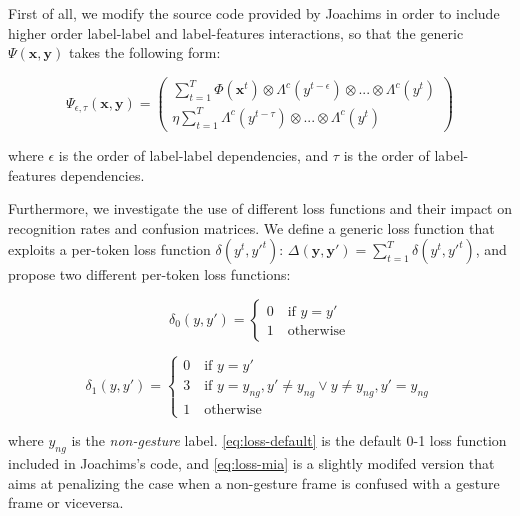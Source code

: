  First of all, we modify the source code provided by Joachims \cite{joachims} in order to include higher order label-label and label-features interactions, so that the generic 
$\Psi(\mathbf{x},\mathbf{y})$ takes the following form:

\begin{equation}
\Psi_{\epsilon,\tau}(\mathbf{x},\mathbf{y}) = \left( \begin{array}{cc} \sum_{t=1}^T \Phi(\mathbf{x}^t) \otimes  \Lambda^c(y^{t-\epsilon}) \otimes ... \otimes \Lambda^c(y^t) \\ \eta\sum_{t=1}^{T}  \Lambda^c(y^{t-\tau}) \otimes ... \otimes \Lambda^c(y^t) \end{array} \right)
\end{equation}

where $\epsilon$ is the order of label-label dependencies, and $\tau$ is the order of label-features dependencies.

Furthermore, we investigate the use of different loss functions and their impact on recognition rates and confusion matrices. We define a generic loss function that exploits a per-token loss function $\delta(y^t,y'^t)$: $\Delta(\mathbf{y},\mathbf{y'}) = \sum_{t=1}^T \delta(y^t,y'^t)$, and propose two different per-token loss functions:

\begin{equation}
\delta_0(y,y') = \begin{cases} 0 \quad \text{if } y= y'  \\ 
1 \quad \text{otherwise}\end{cases}
\label{eq:loss-default}
\end{equation}

\begin{equation}
\delta_1(y,y') = \begin{cases} 0 \quad \text{if } y= y'  \\ 
3 \quad \text{if } y=y_{ng}, y' \neq y_{ng} \lor y\neq y_{ng}, y'=y_{ng}  \\
1 \quad \text{otherwise}\end{cases}
\label{eq:loss-mia}
\end{equation}

where $y_{ng}$ is the \textit{non-gesture} label. \ref{eq:loss-default} is the default 0-1 loss function included in Joachims's code, and \ref{eq:loss-mia} is a slightly modifed version that aims at penalizing the case when a non-gesture frame is confused with a gesture frame or viceversa.

